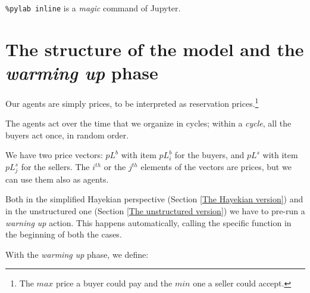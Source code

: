 \documentclass[10pt]{report}
\begin{document}
\verb|%pylab inline| 
is a \emph{magic} command of Jupyter.

\section{The structure of the model and the \emph{warming up} phase}\label{The structure of the model}

Our agents are simply prices, to be interpreted as reservation prices.\footnote{The $max$ price a buyer could pay and the $min$ one a seller could accept.}

The agents act over the time that we organize in cycles; within a \emph{cycle}, all the buyers act once, in random order.

We have two price vectors: $pL^b$ with item $pL^b_i$ for the buyers, and $pL^s$ with item $pL^s_j$ for the sellers. The $i^{th}$ or the $j^{th}$ elements of the vectors are prices, but  we can use them also as agents.

Both in the simplified Hayekian perspective (Section \ref{The Hayekian version}) and in the unstructured one (Section \ref{The unstructured version}) we have to pre-run a \emph{warning up} action. This happens automatically, calling the specific function in the beginning of both the cases.

With the \emph{warming up} phase, we define:\label{parameters}
\end{document}
